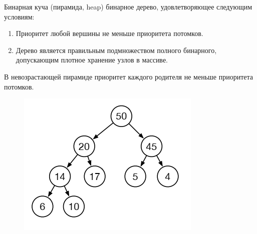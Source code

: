 \documentclass{beamer}
\begin{document}
\begin{frame}
	\begin{block}{Бинарная куча (пирамида, heap)}
		 бинарное дерево, удовлетворяющее следующим условиям:
		 \begin{enumerate}
			\item Приоритет любой вершины не меньше приоритета потомков.
			\item Дерево является правильным подмножеством полного бинарного, допускающим плотное хранение узлов в массиве.		 
		 \end{enumerate}
	\end{block}
	В невозрастающей пирамиде приоритет каждого родителя не меньше приоритета потомков.
	\begin{figure}[h]
		\centering
		\includegraphics[scale=0.5]{images/lec06-pic03.png}
	\end{figure}		
\end{frame}
\end{document}
